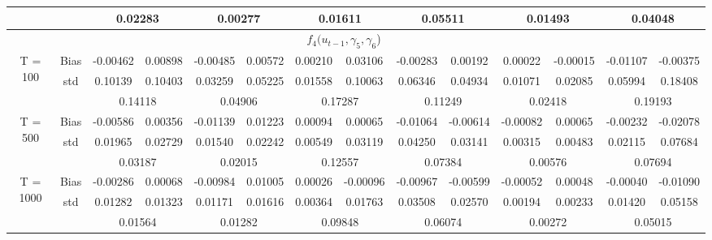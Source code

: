 \documentclass[a4paper,12pt,times,numbered,print,index]{report}
\numberwithin{equation}{section}
\begin{document}
\begin{table}[htbp]
\begin{adjustbox}{max width=\textwidth}
\begin{tabular}{cccccccccccccc}
          &       & \multicolumn{2}{c}{0.02283} & \multicolumn{2}{c}{0.00277} & \multicolumn{2}{c}{0.01611} & \multicolumn{2}{c}{0.05511} & \multicolumn{2}{c}{0.01493} & \multicolumn{2}{c}{0.04048} \\
    \midrule
    &       & \multicolumn{10}{c}{$f_4 (u_{t-1}, \gamma_5, \gamma_6$)}                \\
    \midrule
    \multirow{3}[1]{*}{T = 100} & Bias  & -0.00462 & 0.00898 & -0.00485 & 0.00572 & 0.00210 & 0.03106 & -0.00283 & 0.00192 & 0.00022 & -0.00015 & -0.01107 & -0.00375 \\
          & std   & 0.10139 & 0.10403 & 0.03259 & 0.05225 & 0.01558 & 0.10063 & 0.06346 & 0.04934 & 0.01071 & 0.02085 & 0.05994 & 0.18408 \\
          &       & \multicolumn{2}{c}{0.14118} & \multicolumn{2}{c}{0.04906} & \multicolumn{2}{c}{\textcolor[rgb]{ .329,  .51,  .208}{0.17287}} & \multicolumn{2}{c}{0.11249} & \multicolumn{2}{c}{0.02418} & \multicolumn{2}{c}{\textcolor[rgb]{ .329,  .51,  .208}{0.19193}} \\
    \multirow{3}[0]{*}{T = 500} & Bias  & -0.00586 & 0.00356 & -0.01139 & 0.01223 & 0.00094 & 0.00065 & -0.01064 & -0.00614 & -0.00082 & 0.00065 & -0.00232 & -0.02078 \\
          & std   & 0.01965 & 0.02729 & 0.01540 & 0.02242 & 0.00549 & 0.03119 & 0.04250 & 0.03141 & 0.00315 & 0.00483 & 0.02115 & 0.07684 \\
          &       & \multicolumn{2}{c}{0.03187} & \multicolumn{2}{c}{0.02015} & \multicolumn{2}{c}{\textcolor[rgb]{ .329,  .51,  .208}{0.12557}} & \multicolumn{2}{c}{0.07384} & \multicolumn{2}{c}{0.00576} & \multicolumn{2}{c}{\textcolor[rgb]{ .329,  .51,  .208}{0.07694}} \\
    \multirow{3}[1]{*}{T = 1000} & Bias  & -0.00286 & 0.00068 & -0.00984 & 0.01005 & 0.00026 & -0.00096 & -0.00967 & -0.00599 & -0.00052 & 0.00048 & -0.00040 & -0.01090 \\
          & std   & 0.01282 & 0.01323 & 0.01171 & 0.01616 & 0.00364 & 0.01763 & 0.03508 & 0.02570 & 0.00194 & 0.00233 & 0.01420 & 0.05158 \\
          &       & \multicolumn{2}{c}{0.01564} & \multicolumn{2}{c}{0.01282} & \multicolumn{2}{c}{\textcolor[rgb]{ .329,  .51,  .208}{0.09848}} & \multicolumn{2}{c}{0.06074} & \multicolumn{2}{c}{0.00272} & \multicolumn{2}{c}{\textcolor[rgb]{ .329,  .51,  .208}{0.05015}} \\
    \bottomrule
    \bottomrule
    \end{tabular}%
    \end{adjustbox}
  \label{s_f34}%
\end{table}%
\end{document}
